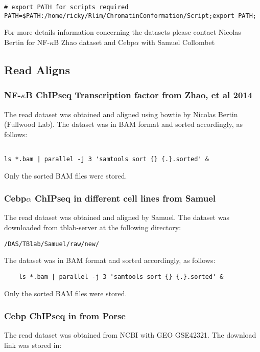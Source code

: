 \documentclass{article}\usepackage[]{graphicx}\usepackage[]{color}
\begin{document}
\begin{verbatim}
# export PATH for scripts required 
PATH=$PATH:/home/ricky/Rlim/ChromatinConformation/Script;export PATH;
\end{verbatim}

\small{For more details information concerning the datasets please contact Nicolas Bertin for NF-$\kappa$B Zhao dataset and Cebp$\alpha$ with Samuel Collombet}
\subsection{Read Aligns}

\subsubsection{NF-$\kappa$B ChIPseq Transcription factor from Zhao, et al 2014}
The read dataset was obtained and aligned using bowtie by Nicolas Bertin (Fullwood Lab).
The dataset was in BAM format and sorted accordingly, as follows: 

\begin{verbatim}

ls *.bam | parallel -j 3 'samtools sort {} {.}.sorted' & 

\end{verbatim}

Only the sorted BAM files were stored.


\subsubsection{Cebp$\alpha$ ChIPseq in different cell lines from Samuel}
The read dataset was obtained and aligned by Samuel.
The dataset was downloaded from tblab-server at the following directory:

\verb |/DAS/TBlab/Samuel/raw/new/| 

The dataset was in BAM format and sorted accordingly, as follows: 

\begin{verbatim}
    ls *.bam | parallel -j 3 'samtools sort {} {.}.sorted' & 
\end{verbatim}

Only the sorted BAM files were stored.

\subsubsection{Cebp ChIPseq in from Porse}
The read dataset was obtained from NCBI with GEO GSE42321. 
The download link was stored in: 
\end{document}
